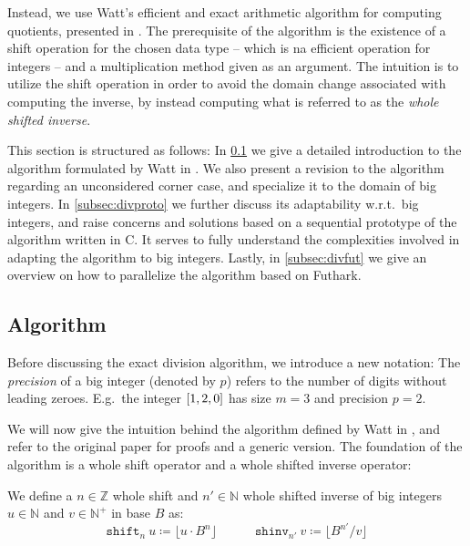 Instead, we use Watt's efficient and exact arithmetic algorithm for computing
quotients, presented in \cite{watt2023efficient}. The prerequisite of the
algorithm is the existence of a shift operation for the chosen data type -- which
is na efficient operation for integers -- and a multiplication method given as an
argument. The intuition is to utilize the shift operation in order to avoid the
domain change associated with computing the inverse, by instead computing what
is referred to as the \textit{whole shifted inverse}.

This section is structured as follows: In \ref{subsec:divalg} we give a detailed
introduction to the algorithm formulated by Watt in \cite{watt2023efficient}. We
also present a revision to the algorithm regarding an unconsidered corner case,
and specialize it to the domain of big integers. In \ref{subsec:divproto} we
further discuss its adaptability w.r.t.\ big integers, and raise concerns and
solutions based on a sequential prototype of the algorithm written in C. It
serves to fully understand the complexities involved in adapting the algorithm
to big integers. Lastly, in \ref{subsec:divfut} we give an overview on how to
parallelize the algorithm based on Futhark.

\subsection{Algorithm}
\label{subsec:divalg}

Before discussing the exact division algorithm, we introduce a new notation: The
\textit{precision} of a big integer (denoted by $p$) refers to the number of
digits without leading zeroes. E.g.\ the integer $\mathtt{[}1,2,0\mathtt{]}$ has size $m=3$
and precision $p=2$.

We will now give the intuition behind the algorithm defined by Watt in
\cite{watt2023efficient}, and refer to the original paper for proofs and a
generic version. The foundation of the algorithm is a whole shift operator and a
whole shifted inverse operator:

\begin{definition}\label{def:shifts}
  We define a $n \in \mathbb{Z}$ whole shift and $n' \in \mathbb{N}$ whole shifted inverse of big
  integers $u\in \mathbb{N}$ and $v\in \mathbb{N}^{+}$ in base $B$ as:
  \begin{equation}\label{eq:shifts}
    \mathtt{shift}_n~u \coloneq \lfloor u \cdot B^n \rfloor \quad \qquad \mathtt{shinv}_{n'}~v \coloneq \lfloor B^{n'}/ v \rfloor
    \end{equation}
\end{definition}

